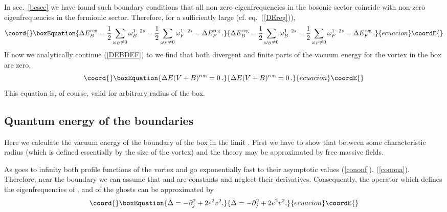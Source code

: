 \documentclass[a4paper,12pt]{article}
\begin{document}
In sec.\ \ref{bcsec} we have found such boundary conditions that
all non-zero eigenfrequencies in the bosonic sector coincide with
non-zero eigenfrequencies in the fermionic sector. Therefore, for
a sufficiently large \coordHE{} (cf. eq.\ (\ref{DEreg})),
\begin{equation}\coord{}\boxEquation{
\Delta E_B^{\rm reg} = \frac 12 \sum_{\omega_B\ne 0}
\omega_B^{1-2s} =\frac 12 \sum_{\omega_F\ne 0} \omega_F^{1-2s} =
\Delta E_F^{\rm reg} \,.\label{DEBDEF}
}{
\Delta E_B^{\rm reg} = \frac 12 \sum_{\omega_B\ne 0}
\omega_B^{1-2s} =\frac 12 \sum_{\omega_F\ne 0} \omega_F^{1-2s} =
\Delta E_F^{\rm reg} \,.}{ecuacion}\coordE{}\end{equation}
If now we analytically continue (\ref{DEBDEF}) to \coordHE{} we find
that both divergent and finite parts of the vacuum energy for the
vortex in the box are zero,
\begin{equation}\coord{}\boxEquation{
\Delta E(V+B)^{\rm ren} =0 \,.\label{1term}
}{
\Delta E(V+B)^{\rm ren} =0 \,.}{ecuacion}\coordE{}\end{equation}
This equation is, of course, valid for arbitrary radius \coordHE{} of the
box.

\subsection{Quantum energy of the boundaries}
Here we calculate the vacuum energy of the boundary of the box
in the limit \coordHE{}. First we have to show that between
some characteristic radius \coordHE{} (which is defined essentially by
the size of the vortex) and \coordHE{} the theory may be approximated
by free massive fields.

As \coordHE{} goes to infinity both profile functions of the vortex \coordHE{}
and \coordHE{} go exponentially fast to their asymptotic values
(\ref{cononf}), (\ref{conona}). Therefore, near the boundary we
can assume that \coordHE{} and \coordHE{} are constants and neglect their
derivatives. Consequently, the operator \coordHE{} which defines
the eigenfrequencies of \coordHE{}, \coordHE{} and of the ghosts \myHighlight{$\sigma$}\coordHE{}
can be approximated by
\begin{equation}\coord{}\boxEquation{
\tilde \Delta =-\partial_j^2 +2e^2v^2.\label{asop}
}{
\tilde \Delta =-\partial_j^2 +2e^2v^2.}{ecuacion}\coordE{}\end{equation}
\end{document}
